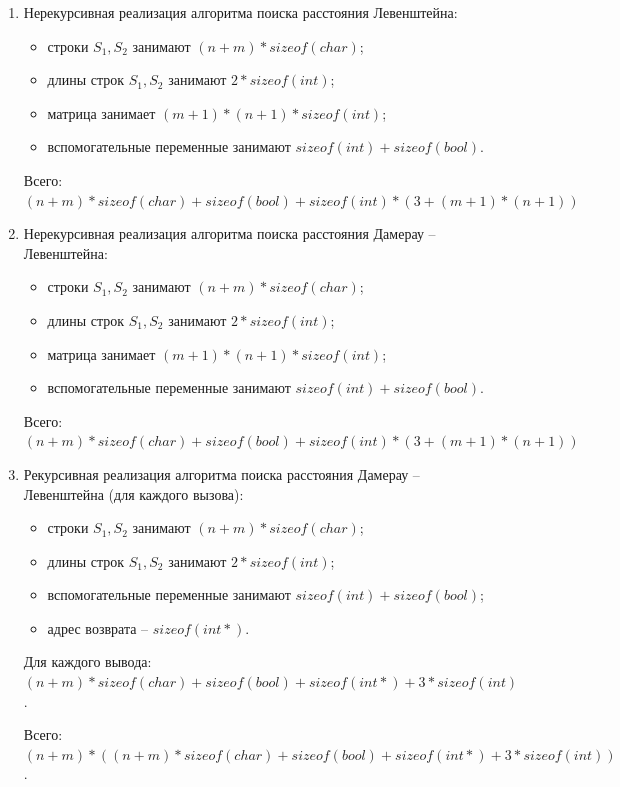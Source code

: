 \begin{enumerate}[label={\arabic*)}]
    \item Нерекурсивная реализация алгоритма поиска расстояния Левенштейна:
    \begin{itemize}
        \item строки $S_1, S_2$ занимают $(n + m) * sizeof(char)$;
        \item длины строк $S_1, S_2$ занимают $2 * sizeof(int)$;
        \item матрица занимает $(m + 1) * (n + 1) * sizeof(int)$;
        \item вспомогательные переменные занимают $sizeof(int) + sizeof(bool)$.
    \end{itemize}
    Всего: $(n + m) * sizeof(char) + sizeof(bool) + sizeof(int) * (3 + (m + 1) * (n + 1) )$ 
    \item Нерекурсивная реализация алгоритма поиска расстояния Дамерау -- Левенштейна:
    \begin{itemize}
        \item строки $S_1, S_2$ занимают $(n + m) * sizeof(char)$;
        \item длины строк $S_1, S_2$ занимают $2 * sizeof(int)$;
        \item матрица занимает $(m + 1) * (n + 1) * sizeof(int)$;
        \item вспомогательные переменные занимают $sizeof(int) + sizeof(bool)$.
    \end{itemize}
    Всего: $(n + m) * sizeof(char) + sizeof(bool) + sizeof(int) * (3 + (m + 1) * (n + 1) )$ 
    \item Рекурсивная реализация алгоритма поиска расстояния Дамерау -- Левенштейна (для каждого вызова):
     \begin{itemize}
        \item строки $S_1, S_2$ занимают $(n + m) * sizeof(char)$;
        \item длины строк $S_1, S_2$ занимают $2 * sizeof(int)$;
        \item вспомогательные переменные занимают $sizeof(int) + sizeof(bool)$;
        \item адрес возврата -- $sizeof(int*)$.
       
    \end{itemize}
   Для каждого вывода: $(n + m) * sizeof(char) + sizeof(bool) + sizeof(int*) + 3 * sizeof(int)$.
   
    Всего: $(n + m) *((n + m) * sizeof(char) + sizeof(bool) + sizeof(int*) + 3 * sizeof(int))$. 
    

\end{enumerate}
